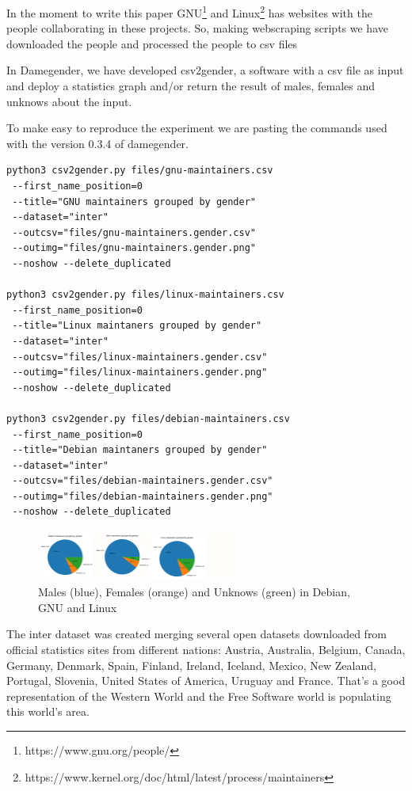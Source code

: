 \documentclass[a4paper]{article}
\begin{document}
In the moment to write this paper
GNU\footnote{https://www.gnu.org/people/} and
Linux\footnote{https://www.kernel.org/doc/html/latest/process/maintainers}
has websites with the people collaborating in these projects. So,
making webscraping scripts we have downloaded the people and processed
the people to csv files

In Damegender, we have developed csv2gender, a software with a csv
file as input and deploy a statistics graph and/or return the result
of males, females and unknows about the input.

To make easy to reproduce the experiment we are pasting the commands
used with the version 0.3.4 of damegender.

\begin{verbatim}
python3 csv2gender.py files/gnu-maintainers.csv
 --first_name_position=0 
 --title="GNU maintainers grouped by gender"
 --dataset="inter" 
 --outcsv="files/gnu-maintainers.gender.csv"
 --outimg="files/gnu-maintainers.gender.png" 
 --noshow --delete_duplicated

python3 csv2gender.py files/linux-maintainers.csv
 --first_name_position=0 
 --title="Linux maintaners grouped by gender"
 --dataset="inter" 
 --outcsv="files/linux-maintainers.gender.csv"
 --outimg="files/linux-maintainers.gender.png" 
 --noshow --delete_duplicated

python3 csv2gender.py files/debian-maintainers.csv
 --first_name_position=0 
 --title="Debian maintaners grouped by gender"
 --dataset="inter" 
 --outcsv="files/debian-maintainers.gender.csv"
 --outimg="files/debian-maintainers.gender.png" 
 --noshow --delete_duplicated
\end{verbatim}

\begin{figure}
  \centering
  \includegraphics[width=0.6\textwidth]{images/debian-gnu-linux.pdf}     
  \caption[Caption for LOF]{Males (blue), Females (orange) and Unknows (green) in Debian, GNU and Linux}
\end{figure}

The inter dataset was created merging several open datasets downloaded
from official statistics sites from different nations: Austria,
Australia, Belgium, Canada, Germany, Denmark, Spain, Finland, Ireland,
Iceland, Mexico, New Zealand, Portugal, Slovenia, United States of
America, Uruguay and France. That's a good representation of the
Western World and the Free Software world is populating this world's
area\cite{gonzalez2008geographic}.
\end{document}
